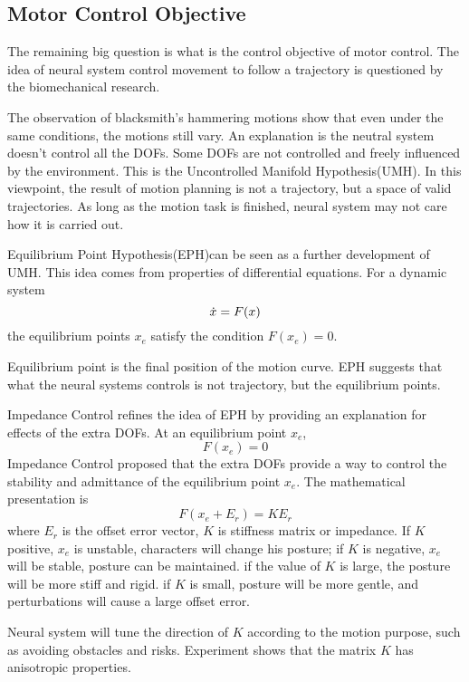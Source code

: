 \subsection{Motor Control Objective}
The remaining big question is what is the control objective of motor control.
The idea of neural system control movement to follow a trajectory is questioned by the biomechanical research.

The observation of blacksmith's hammering motions show that even under the same conditions, the motions still vary. 
An explanation is the neutral system doesn't control all the DOFs. 
Some DOFs are not controlled and freely influenced by the environment. 
This is the Uncontrolled Manifold Hypothesis(UMH)\citep{latash2008neurophysiological}. 
In this viewpoint, the result of motion planning is not a trajectory, but a space of valid trajectories. As long as the motion task is finished, neural system may not care how it is carried out.



Equilibrium Point Hypothesis(EPH)\citep{Feldman1986}can be seen as a further development of UMH. 
This idea comes from properties of differential equations. 
For a dynamic system
\[
\dot{x}=F(x)
\]
the equilibrium points $x_{e}$ satisfy the condition $F(x_{e})=0$.

Equilibrium point is the final position of the motion curve.
EPH suggests that what the neural systems controls is not trajectory, but the equilibrium points.



Impedance Control \citep{hogan1985ica} refines the idea of EPH by providing an explanation for effects of the extra DOFs. 
At an equilibrium point $x_{e}$,
\[
F(x_{e})=0 
\]
Impedance Control proposed that the extra DOFs provide a way to control the stability and admittance of the equilibrium point $x_{e}$. 
The mathematical presentation is
\begin{equation}
F(x_{e}+E_r)=KE_r
\end{equation}
where $E_r$ is the offset error vector, $K$ is stiffness matrix or impedance.
If $K$ positive, $x_{e}$ is unstable, characters will change his posture;
if $K$ is negative, $x_{e}$ will be stable, posture can be maintained.
if the value of $K$ is large, the posture will be more stiff and rigid.
if $K$ is small, posture will be more gentle, and perturbations will cause a large offset error.

Neural system will tune the direction of $K$ according to the motion purpose, such as avoiding obstacles and risks. 
Experiment \citep{Franklin2007} shows that the matrix $K$ has anisotropic properties.

